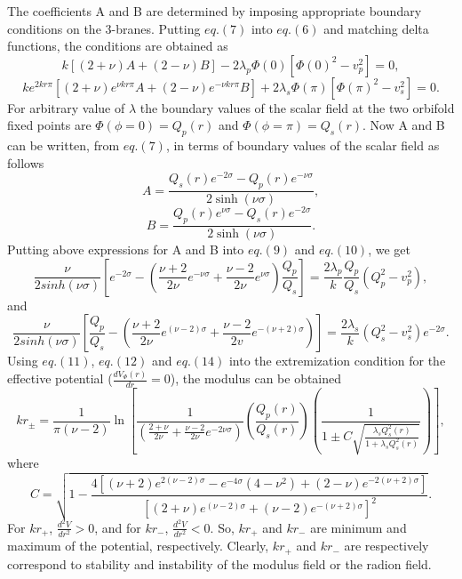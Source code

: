 \documentclass[12pt]{article}
\begin{document}
 The coefficients A and B are determined by
imposing appropriate boundary conditions on the 3-branes. Putting $eq. (7)$ into $eq. (6)$ and matching delta functions, the conditions are obtained as
\begin{equation}
k[(2+\nu)A + (2-\nu)B] -2\lambda_{p}\Phi(0)[\Phi(0)^2 - v_{p}^2]=0,
\end{equation}
\begin{equation}
k e^{2kr\pi}[(2+\nu)e^{\nu kr\pi}A + (2-\nu)e^{-\nu kr \pi}B] +
2\lambda_{s}\Phi(\pi)[\Phi(\pi)^2 - v_{s}^2] = 0.
\end{equation}
For arbitrary value of $\lambda$ the boundary values of the
scalar field at the two orbifold fixed points are $\Phi(\phi = 0) =
Q_p(r)$ and $\Phi(\phi = \pi) = Q_s(r)$. Now A and B can be written, from $eq. (7)$, in terms of boundary values of the scalar field as follows
\begin{equation}
A = \frac {Q_s(r) e^{-2 \sigma} - Q_p(r) e^{- \nu \sigma}}{ 2 \sinh(\nu \sigma)},
\end{equation}
\begin{equation}
B = \frac {Q_p(r) e^{\nu \sigma} - Q_s(r) e^{- 2 \sigma}}{ 2 \sinh(\nu \sigma)}.
\end{equation}
Putting above expressions for A and B into $eq. (9)$ and $eq. (10)$, we get
\begin{equation}
\frac{\nu}{2sinh(\nu \sigma)}[e^{-2\sigma}-(
\frac{\nu+2}{2\nu}e^{-\nu\sigma}+\frac{\nu-2}{2\nu}e^{\nu
\sigma})\frac{Q_p}{Q_s}]=\frac{2\lambda_p}{k}\frac{Q_p}{Q_s}(Q_p^2-v_p^2),
\end{equation}
and
\begin{equation}
\frac{\nu}{2sinh(\nu \sigma)}[\frac{Q_p}{Q_s}-(
\frac{\nu+2}{2\nu}e^{(\nu-2)\sigma}+\frac{\nu-2}{2v}e^{-(\nu+2)\sigma})]
=\frac{2\lambda_s}{k}(Q_s^2-v_s^2)e^{-2\sigma}.
\end{equation}
Using $eq. (11)$, $eq. (12)$ and $eq. (14)$ into the extremization condition for the effective potential ($\frac{dV_{\Phi}(r)}{dr}=0$), the modulus can be obtained
\begin{equation}
kr_{\pm}=\frac{1}{\pi(\nu-2)}\ln[\frac{1}{(\frac{2+\nu}{2\nu}+\frac{\nu-2}{2\nu}e^{-2\nu\sigma})}
(\frac{Q_p(r)}{Q_s(r)}) (\frac{1}{1\pm C\sqrt{\frac{\lambda_s
Q^2_s(r)}{1+\lambda_sQ^2_s(r)}}})],
\end{equation}
where
\begin{equation}
C=\sqrt{1-\frac{4[(\nu+2)e^{2(\nu-2)\sigma}-e^{-4\sigma}(4-\nu^2)+(2-\nu)e^{-2(\nu+2)\sigma}]}
{[(2+\nu)e^{(\nu-2)\sigma}+(\nu-2)e^{-(\nu+2)\sigma}]^2}}.
\end{equation}
For $kr_{+}$, $\frac{d^{2}V}{dr^{2}}>0$, and for $kr_{-}$, $\frac{d^{2}V}{dr^{2}}<0$. So, $kr_{+}$ and $kr_{-}$ are minimum and maximum of the potential, respectively. Clearly, $kr_{+}$ and $kr_{-}$ are respectively correspond to stability and instability of the modulus field or the radion field.
\end{document}
